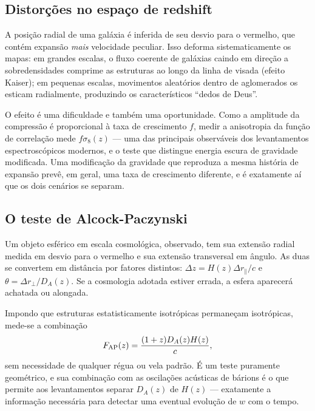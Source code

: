 \documentclass[11pt,a4paper]{article}
\begin{document}
\subsection*{Distorções no espaço de redshift}

A posição radial de uma galáxia é inferida de seu desvio para o vermelho, que contém expansão \emph{mais} velocidade peculiar. Isso deforma sistematicamente os mapas: em grandes escalas, o fluxo coerente de galáxias caindo em direção a sobredensidades comprime as estruturas ao longo da linha de visada (efeito Kaiser); em pequenas escalas, movimentos aleatórios dentro de aglomerados os esticam radialmente, produzindo os característicos ``dedos de Deus''.

O efeito é uma dificuldade e também uma oportunidade. Como a amplitude da compressão é proporcional à taxa de crescimento $f$, medir a anisotropia da função de correlação mede $f\sigma_8(z)$ --- uma das principais observáveis dos levantamentos espectroscópicos modernos, e o teste que distingue energia escura de gravidade modificada. Uma modificação da gravidade que reproduza a mesma história de expansão prevê, em geral, uma taxa de crescimento diferente, e é exatamente aí que os dois cenários se separam.

\subsection*{O teste de Alcock-Paczynski}

Um objeto esférico em escala cosmológica, observado, tem sua extensão radial medida em desvio para o vermelho e sua extensão transversal em ângulo. As duas se convertem em distância por fatores distintos: $\Delta z=H(z)\Delta r_\parallel/c$ e $\theta=\Delta r_\perp/D_A(z)$. Se a cosmologia adotada estiver errada, a esfera aparecerá achatada ou alongada.

Impondo que estruturas estatisticamente isotrópicas permaneçam isotrópicas, mede-se a combinação
\[
F_{\rm AP}(z)=\frac{(1+z)D_A(z)H(z)}{c},
\]
sem necessidade de qualquer régua ou vela padrão. É um teste puramente geométrico, e sua combinação com as oscilações acústicas de bárions é o que permite aos levantamentos separar $D_A(z)$ de $H(z)$ --- exatamente a informação necessária para detectar uma eventual evolução de $w$ com o tempo.
\end{document}

